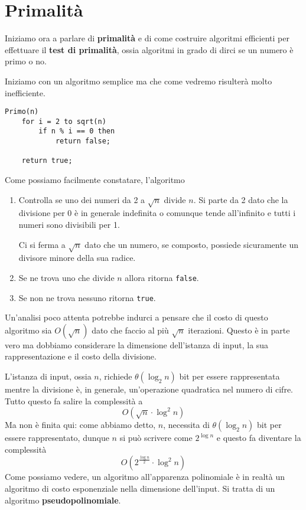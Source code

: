 \chapter{Primalit\`a}
Iniziamo ora a parlare di \textbf{primalit\`a} e di come costruire algoritmi efficienti per effettuare il
\textbf{test di primalit\`a}, ossia algoritmi in grado di dirci se un numero \`e primo o no.

Iniziamo con un algoritmo semplice ma che come vedremo risulter\`a molto inefficiente.
\begin{lstlisting}[style=pseudo-style]
Primo(n)
	for i = 2 to sqrt(n)
		if n % i == 0 then
			return false;
	
	return true;
\end{lstlisting}
Come possiamo facilmente constatare, l'algoritmo
\begin{enumerate}
	\item Controlla se uno dei numeri da 2 a $\sqrt{n}$ divide $n$. Si parte da 2 dato che la divisione per 0 \`e in
	      generale indefinita o comunque tende all'infinito e tutti i numeri sono divisibili per 1.

	      Ci si ferma a $\sqrt{n}$ dato che un numero, se composto, possiede sicuramente un divisore minore della sua
	      radice.
	\item Se ne trova uno che divide $n$ allora ritorna \verb|false|.
	\item Se non ne trova nessuno ritorna \verb|true|.
\end{enumerate}
Un'analisi poco attenta potrebbe indurci a pensare che il costo di questo algoritmo sia $O(\sqrt{n})$ dato che faccio al
pi\`u $\sqrt{n}$ iterazioni. Questo \`e in parte vero ma dobbiamo considerare la dimensione dell'istanza di input, la
sua rappresentazione e il costo della divisione.

L'istanza di input, ossia $n$, richiede $\theta(\log_2 n)$ bit per essere rappresentata mentre la divisione \`e, in
generale, un'operazione quadratica nel numero di cifre. Tutto questo fa salire la complessit\`a a
\[ O(\sqrt{n} \cdot \log^2 n) \]
Ma non \`e finita qui: come abbiamo detto, $n$, necessita di $\theta(\log_2 n)$ bit per essere rappresentato, dunque $n$
si pu\`o scrivere come $2^{\log n}$ e questo fa diventare la complessit\`a
\[ O(2^\frac{\log n}{2} \cdot \log^2 n) \]
Come possiamo vedere, un algoritmo all'apparenza polinomiale \`e in realt\`a un algoritmo di costo esponenziale nella
dimensione dell'input. Si tratta di un algoritmo \textbf{pseudopolinomiale}.

